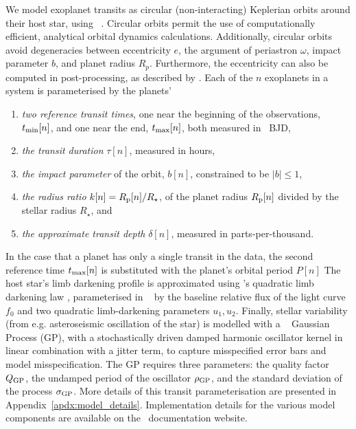 \documentclass[floatfix,ApJL,twocolumn]{aastex631}
\begin{document}
We model exoplanet transits as circular (non-interacting) Keplerian orbits around their host star, using \exoplanet~\citep{Foreman-Mackey:2021:JOSS}. 
Circular orbits permit the use of computationally efficient, analytical orbital dynamics calculations.
Additionally, circular orbits avoid degeneracies between eccentricity $e$, the argument of periastron $\omega$, impact parameter $b$, and planet radius $R_p$. 
Furthermore, the eccentricity can also be computed in post-processing, as described by \citet{Dawson:2012:ApJ}.
Each of the $n$ exoplanets in a system is parameterised by the planets'
\begin{enumerate}
  \item \emph{two reference transit times}, one near the beginning of the observations, $t_{\rm min}[n]$, and one near the end, $t_{\rm max}[n]$, both measured in \tess\ BJD,
  \item \emph{the transit duration} $\tau[n]$, measured in hours,
  \item \emph{the impact parameter} of the orbit, $b[n]$, constrained to be $|b| \le 1$,
  \item \emph{the radius ratio} $k[n]=R_{\rm p}[n] / R_\star$, of the planet radius $R_{\rm p}[n]$ divided by the stellar radius $R_\star$, and
  \item \emph{the approximate transit depth} $\delta[n]$, measured in parts-per-thousand.
\end{enumerate}
In the case that a planet has only a single transit in the data, the second reference time $t_{\rm max}[n]$ is substituted with the planet's orbital period $P[n]$
The host star's limb darkening profile is approximated using \citet{Kipping:2013:MNRAS}'s quadratic limb darkening law \citep{Claret:2000:A&A, Mandel:2002:ApJL}, parameterised in \starry~\citep{Luger:2019:AJ} by the baseline relative flux of the light curve $f_0$ and two quadratic limb-darkening parameters $u_1, u_2$.
Finally, stellar variability (from e.g. asteroseismic oscillation of the star)  is modelled with a \celerite~\citep{Foreman-Mackey:2017:ascl} Gaussian Process (GP), with a stochastically driven damped harmonic oscillator kernel in linear combination with a jitter term, to capture misspecified error bars and model misspecification.
The GP requires three parameters: the quality factor $Q_{\rm GP}$, the undamped period of the oscillator $\rho_{\rm GP}$, and the standard deviation of the process $\sigma_{\rm GP}$. 
More details of this transit parameterisation are presented in Appendix~\ref{apdx:model_details}. 
Implementation details for the various model components are available on the \exoplanet\ documentation website. 
\end{document}
